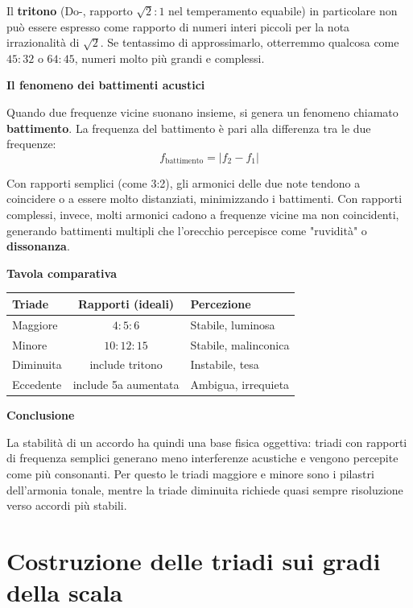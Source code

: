 \begin{fisica}
	Il \textbf{tritono} (Do-\Solbemolle , rapporto $\sqrt{2}:1$ nel temperamento equabile) in particolare non può essere espresso come rapporto di numeri interi piccoli per la nota irrazionalità di $\sqrt{2}$. Se tentassimo di approssimarlo, otterremmo qualcosa come $45:32$ o $64:45$, numeri molto più grandi e complessi.
	
	\textbf{Il fenomeno dei battimenti acustici}
	
	Quando due frequenze vicine suonano insieme, si genera un fenomeno chiamato \textbf{battimento}. La frequenza del battimento è pari alla differenza tra le due frequenze:
	\[
	f_{\text{battimento}} = |f_2 - f_1|
	\]
	
	Con rapporti semplici (come 3:2), gli armonici delle due note tendono a coincidere o a essere molto distanziati, minimizzando i battimenti. Con rapporti complessi, invece, molti armonici cadono a frequenze vicine ma non coincidenti, generando battimenti multipli che l'orecchio percepisce come "ruvidità" o \textbf{dissonanza}.
	
	\textbf{Tavola comparativa}
	
	\begin{center}
	\begin{tabular}{|l|c|l|}
	\hline
	\textbf{Triade} & \textbf{Rapporti (ideali)} & \textbf{Percezione} \\
	\hline
	Maggiore & $4:5:6$ & Stabile, luminosa \\
	Minore & $10:12:15$ & Stabile, malinconica \\
	Diminuita & include tritono & Instabile, tesa \\
	Eccedente & include 5a aumentata & Ambigua, irrequieta \\
	\hline
	\end{tabular}
	\end{center}
	
	\textbf{Conclusione}
	
	La stabilità di un accordo ha quindi una base fisica oggettiva: triadi con rapporti di frequenza semplici generano meno interferenze acustiche e vengono percepite come più consonanti. Per questo le triadi maggiore e minore sono i pilastri dell'armonia tonale, mentre la triade diminuita richiede quasi sempre risoluzione verso accordi più stabili.
\end{fisica}


\section{Costruzione delle triadi sui gradi della scala}
\label{sec:triadi_sui_gradi}

